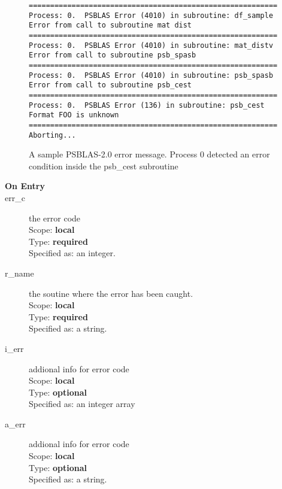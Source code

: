 \begin{figure}[h!]
  \begin{Sbox}
    \begin{minipage}[tl]{0.95\textwidth}
\begin{verbatim}
==========================================================
Process: 0.  PSBLAS Error (4010) in subroutine: df_sample           
Error from call to subroutine mat dist            
==========================================================
Process: 0.  PSBLAS Error (4010) in subroutine: mat_distv           
Error from call to subroutine psb_spasb           
==========================================================
Process: 0.  PSBLAS Error (4010) in subroutine: psb_spasb           
Error from call to subroutine psb_cest            
==========================================================
Process: 0.  PSBLAS Error (136) in subroutine: psb_cest            
Format FOO is unknown
==========================================================
Aborting...
\end{verbatim}
    \end{minipage}
  \end{Sbox}
  \setlength{\fboxsep}{8pt}
  \begin{center}
    \fbox{\TheSbox}
  \end{center}
  \caption{\label{fig:errormsg}A sample PSBLAS-2.0 error
    message. Process 0 detected an error condition inside the {\textrm
    psb\_cest} subroutine}
\end{figure}




\begin{description}
\item[\bf On Entry]
\item[err\_c] the error code\\
Scope: {\bf local} \\
Type: {\bf required}\\
Specified as: an integer.
\item[r\_name] the soutine where the error has been caught.\\
Scope: {\bf local} \\
Type: {\bf required}\\
Specified as: a string.\\
\item[i\_err] addional info for error code\\
Scope: {\bf local} \\
Type: {\bf optional}\\
Specified as: an integer array\\
\item[a\_err] addional info for error code\\
Scope: {\bf local} \\
Type: {\bf optional}\\
Specified as: a string.\\
\end{description}

